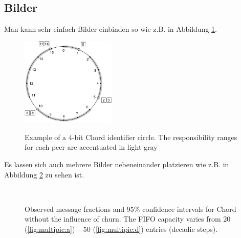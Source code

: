 \subsection{Bilder}
Man kann sehr einfach Bilder einbinden so wie z.B. in Abbildung \ref{fig:pic0}.
\begin{figure}[hpbt]
  \centering
  \includegraphics[width=0.4\textwidth]{pictures/pic0}\\
  \caption[Example of a $4$-bit Chord identifier circle]{Example of a $4$-bit Chord identifier circle.
  The responsibility ranges for each peer are accentuated in light gray}\label{fig:pic0}
\end{figure}
Es lassen sich auch mehrere Bilder nebeneinander platzieren wie z.B. in Abbildung
\ref{fig:multipic} zu sehen ist.
\begin{figure}[hpbt]
 \centering
  \hspace{0.01\textwidth}
  \\[0pt] %
  \hspace{0.01\textwidth}
 \caption[Observed message fractions and 95\% confidence intervals for Chord]{Observed message fractions and 95\% confidence intervals for Chord without the influence of churn. The FIFO capacity varies from 20 (\ref{fig:multipic:a}) -- 50 (\ref{fig:multipic:d}) entries (decadic steps).}
 \label{fig:multipic} %
\end{figure}

